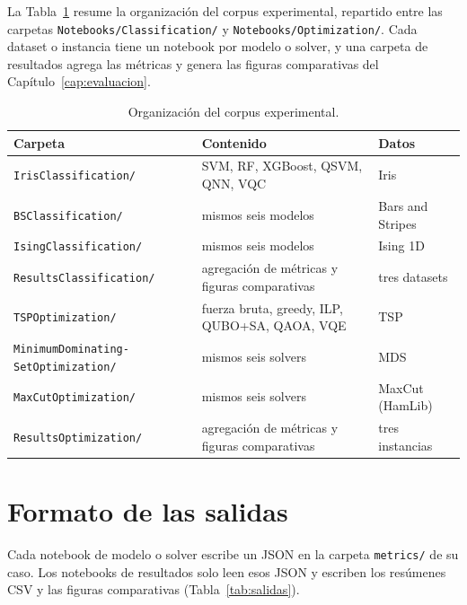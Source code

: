 La Tabla~\ref{tab:notebooks} resume la organización del corpus experimental, repartido entre las carpetas \texttt{Notebooks/Classification/} y \texttt{Notebooks/Optimization/}. Cada dataset o instancia tiene un notebook por modelo o solver, y una carpeta de resultados agrega las métricas y genera las figuras comparativas del Capítulo~\ref{cap:evaluacion}.

\begin{table}[!htbp]
\centering
\footnotesize
\setlength{\tabcolsep}{4pt}
\renewcommand{\arraystretch}{1.15}
\begin{tabularx}{\linewidth}{@{}>{\raggedright\arraybackslash}p{4.6cm} >{\raggedright\arraybackslash}X >{\raggedright\arraybackslash}p{2.6cm}@{}}
\toprule
\textbf{Carpeta} & \textbf{Contenido} & \textbf{Datos} \\
\midrule
\texttt{IrisClassification/} & SVM, RF, XGBoost, QSVM, QNN, VQC & Iris \\
\texttt{BSClassification/} & mismos seis modelos & Bars and Stripes \\
\texttt{IsingClassification/} & mismos seis modelos & Ising 1D \\
\texttt{ResultsClassification/} & agregación de métricas y figuras comparativas & tres datasets \\
\texttt{TSPOptimization/} & fuerza bruta, greedy, ILP, QUBO+SA, QAOA, VQE & TSP \\
\texttt{MinimumDominating-} \texttt{SetOptimization/} & mismos seis solvers & MDS \\
\texttt{MaxCutOptimization/} & mismos seis solvers & MaxCut (HamLib) \\
\texttt{ResultsOptimization/} & agregación de métricas y figuras comparativas & tres instancias \\
\bottomrule
\end{tabularx}
\caption{Organización del corpus experimental.}
\label{tab:notebooks}
\end{table}

\section{Formato de las salidas}
\label{anx:salidas}

Cada notebook de modelo o solver escribe un JSON en la carpeta \texttt{metrics/} de su caso. Los notebooks de resultados solo leen esos JSON y escriben los resúmenes CSV y las figuras comparativas (Tabla~\ref{tab:salidas}).

